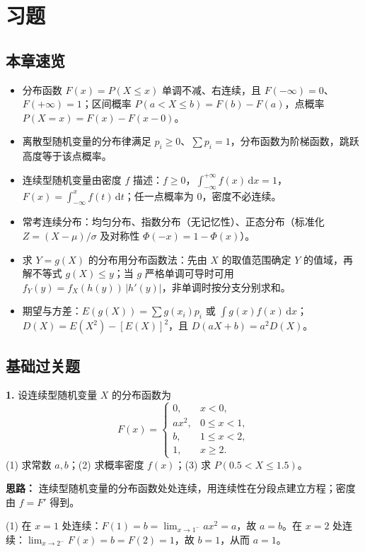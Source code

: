 \section{习题}

\subsection{本章速览}
\begin{itemize}
  \item 分布函数 $F(x)=P(X\leq x)$ 单调不减、右连续，且 $F(-\infty)=0$、$F(+\infty)=1$；区间概率 $P(a<X\leq b)=F(b)-F(a)$，点概率 $P(X=x)=F(x)-F(x-0)$。
  \item 离散型随机变量的分布律满足 $p_i\geq 0$、$\sum p_i=1$，分布函数为阶梯函数，跳跃高度等于该点概率。
  \item 连续型随机变量由密度 $f$ 描述：$f\geq 0$，$\int_{-\infty}^{+\infty}f(x)\,\mathrm{d}x=1$，$F(x)=\int_{-\infty}^{x}f(t)\,\mathrm{d}t$；任一点概率为 $0$，密度不必连续。
  \item 常考连续分布：均匀分布、指数分布（无记忆性）、正态分布（标准化 $Z=(X-\mu)/\sigma$ 及对称性 $\Phi(-x)=1-\Phi(x)$）。
  \item 求 $Y=g(X)$ 的分布用分布函数法：先由 $X$ 的取值范围确定 $Y$ 的值域，再解不等式 $g(X)\leq y$；当 $g$ 严格单调可导时可用 $f_Y(y)=f_X(h(y))\,|h'(y)|$，非单调时按分支分别求和。
  \item 期望与方差：$E(g(X))=\sum g(x_i)p_i$ 或 $\int g(x)f(x)\,\mathrm{d}x$；$D(X)=E(X^2)-[E(X)]^2$，且 $D(aX+b)=a^2D(X)$。
\end{itemize}

\subsection{基础过关题}

\textbf{1.} 设连续型随机变量 $X$ 的分布函数为
\[
F(x)=\begin{cases}
0, & x<0,\\
ax^2, & 0\leq x<1,\\
b, & 1\leq x<2,\\
1, & x\geq 2.
\end{cases}
\]
(1) 求常数 $a,b$；(2) 求概率密度 $f(x)$；(3) 求 $P(0.5<X\leq 1.5)$。

\ifshowsolutions%
\textbf{思路：} 连续型随机变量的分布函数处处连续，用连续性在分段点建立方程；密度由 $f=F'$ 得到。

(1) 在 $x=1$ 处连续：$F(1)=b=\lim_{x\to1^-}ax^2=a$，故 $a=b$。在 $x=2$ 处连续：$\lim_{x\to2^-}F(x)=b=F(2)=1$，故 $b=1$，从而 $a=1$。

